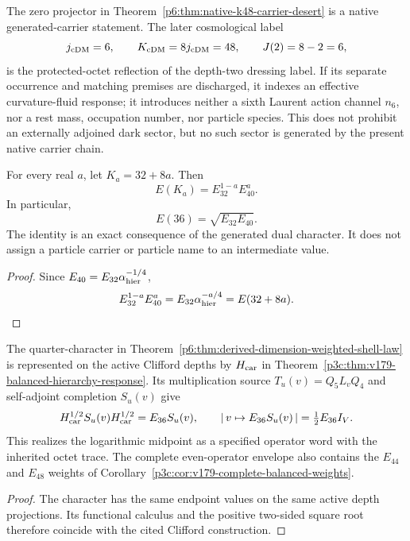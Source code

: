 \documentclass[12pt,a4paper]{article}
\begin{document}
\begin{remark}[The \(K=48\) carrier-desert/cosmic-response firewall]
\label{p6:rem:k48-cosmological-readout-firewall}
The zero projector in
Theorem~\ref{p6:thm:native-k48-carrier-desert} is a native generated-carrier
statement.  The later cosmological label
\[
 j_{\rm cDM}=6,\qquad K_{\rm cDM}=8j_{\rm cDM}=48,
 \qquad J(2)=8-2=6,
\]
is the protected-octet reflection of the depth-two dressing label.  If its
separate occurrence and matching premises are discharged, it indexes an
effective curvature-fluid response; it introduces neither a sixth Laurent
action channel \(n_6\), nor a rest mass, occupation number, nor particle
species.  This does not prohibit an externally adjoined dark sector, but no
such sector is generated by the present native carrier chain.
\end{remark}

\begin{theorem}
\label{p6:thm:logarithmic-interpolation}
For every real \(a\), let \(K_a=32+8a\).  Then
\[
E(K_a)=E_{32}^{1-a}E_{40}^{a}.
\]
In particular,
\[
E(36)=\sqrt{E_{32}E_{40}}.
\]
The identity is an exact consequence of the generated dual character.  It
does not assign a particle carrier or particle name to an intermediate value.
\end{theorem}

\begin{proof}
Since \(E_{40}=E_{32}\alpha_{\rm hier}^{-1/4}\),
\[
E_{32}^{1-a}E_{40}^a
=E_{32}\alpha_{\rm hier}^{-a/4}
=E(32+8a).
\]
\end{proof}

\begin{corollary}
\label{p6:cor:v179-midpoint-action-attachment}
The quarter-character in
Theorem~\ref{p6:thm:derived-dimension-weighted-shell-law} is represented on
the active Clifford depths by \(H_{\rm car}\) in
Theorem~\ref{p3c:thm:v179-balanced-hierarchy-response}.
Its multiplication source \(T_u(v)=Q_5L_vQ_4\) and self-adjoint completion
\(S_u(v)\) give
\[
 H_{\rm car}^{1/2}S_u(v)H_{\rm car}^{1/2}=E_{36}S_u(v),\qquad
 |\,v\mapsto E_{36}S_u(v)\,|=\tfrac12E_{36}I_V .
\]
This realizes the logarithmic midpoint as a specified operator word with
the inherited octet trace.  The complete even-operator envelope also
contains the \(E_{44}\) and \(E_{48}\) weights of
Corollary~\ref{p3c:cor:v179-complete-balanced-weights}.
\end{corollary}
\begin{proof}
The character has the same endpoint values on the same active depth
projections.  Its functional calculus and the positive two-sided square
root therefore coincide with the cited Clifford construction.
\end{proof}
\end{document}
